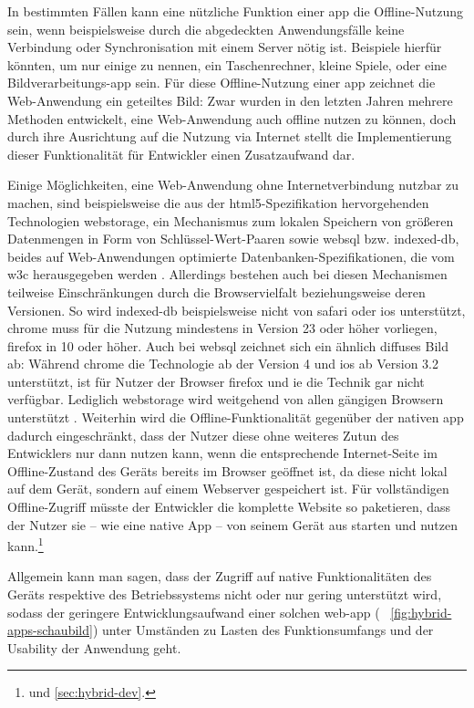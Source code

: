 In bestimmten Fällen kann eine nützliche Funktion einer \gls{app} die Offline-Nutzung sein, wenn beispielsweise durch die abgedeckten Anwendungsfälle keine Verbindung oder Synchronisation mit einem Server nötig ist. Beispiele hierfür könnten, um nur einige zu nennen, ein Taschenrechner, kleine Spiele, oder eine Bildverarbeitungs-\gls{app} sein. 
Für diese Offline-Nutzung einer \gls{app} zeichnet die Web-Anwendung ein geteiltes Bild: Zwar wurden in den letzten Jahren mehrere Methoden entwickelt, eine Web-Anwendung auch offline nutzen zu können, doch durch ihre Ausrichtung auf die Nutzung via Internet stellt die Implementierung dieser Funktionalität für Entwickler einen Zusatzaufwand dar. 

Einige Möglichkeiten, eine Web-Anwendung ohne Internetverbindung nutzbar zu machen, sind beispielsweise die aus der \gls{html5}-Spezifikation hervorgehenden Technologien \gls{webstorage}, ein Mechanismus zum lokalen Speichern von größeren Datenmengen in Form von Schlüssel-Wert-Paaren \cite{w3c_webstorage} sowie \gls{websql} bzw. \gls{indexed-db}, beides auf Web-Anwendungen optimierte Datenbanken-Spezifikationen, die vom \gls{w3c} herausgegeben werden \cite{w3c_websql, w3c_indexedDB}.
Allerdings bestehen auch bei diesen Mechanismen teilweise Einschränkungen durch die Browservielfalt beziehungsweise deren Versionen. So wird \gls{indexed-db} beispielsweise nicht von \gls{safari} oder \gls{ios} unterstützt, \gls{chrome} muss für die Nutzung mindestens in Version 23 oder höher vorliegen, \gls{firefox} in 10 oder höher. 
Auch bei \gls{websql} zeichnet sich ein ähnlich diffuses Bild ab: Während \gls{chrome} die Technologie ab der Version 4 und \gls{ios} ab Version 3.2 unterstützt, ist für Nutzer der Browser \gls{firefox} und \gls{ie} die Technik gar nicht verfügbar.
Lediglich \gls{webstorage} wird weitgehend von allen gängigen Browsern unterstützt \cite{html5-rocks_offline}.
Weiterhin wird die Offline-Funktionalität gegenüber der nativen \gls{app} dadurch eingeschränkt, dass der Nutzer diese ohne weiteres Zutun des Entwicklers nur dann nutzen kann, wenn die entsprechende Internet-Seite im Offline-Zustand des Geräts bereits im Browser geöffnet ist, da diese nicht lokal auf dem Gerät, sondern auf einem Webserver gespeichert ist.
Für vollständigen Offline-Zugriff müsste der Entwickler die komplette Website so paketieren, dass der Nutzer sie -- wie eine native App -- von seinem Gerät aus starten und nutzen kann.\footnote{ und \ref{sec:hybrid-dev}.}

Allgemein kann man sagen, dass der Zugriff auf native Funktionalitäten des Geräts respektive des Betriebssystems nicht oder nur gering unterstützt wird, sodass der geringere Entwicklungsaufwand einer solchen \gls{web-app} (\seename~ \autoref{fig:hybrid-apps-schaubild}) unter Umständen zu Lasten des Funktionsumfangs und der Usability der Anwendung geht.

